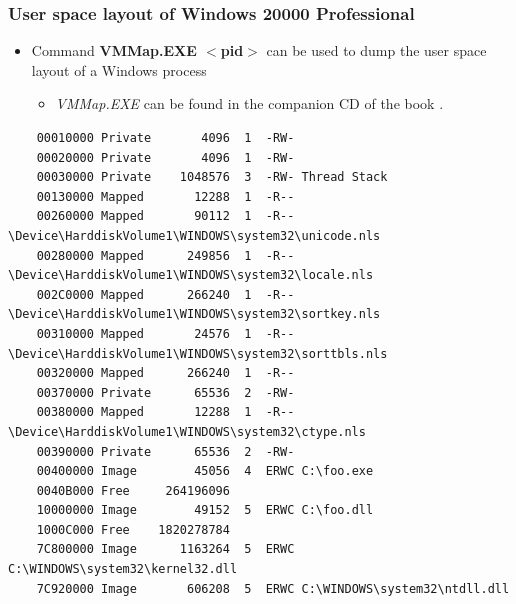 \documentclass[CJKutf8,xcolor=pdftex,dvipsnames,table]{beamer}
\begin{document}
\begin{CJK*}{UTF8}{song}
  \begin{frame}[fragile]
    \frametitle{User space layout of Windows 20000 Professional} \pause
    \begin{itemize}\parskip=0pt
    \item{Command \textbf{VMMap.EXE $<$pid$>$} can be used to dump the user space layout of a Windows process} \pause
      \begin{itemize}
      \item{\emph{VMMap.EXE} can be found in the companion CD of the book .} \pause
      \end{itemize}
    \end{itemize}
    {\tiny
\begin{verbatim}
    00010000 Private       4096  1  -RW-
    00020000 Private       4096  1  -RW-
    00030000 Private    1048576  3  -RW- Thread Stack
    00130000 Mapped       12288  1  -R--
    00260000 Mapped       90112  1  -R-- \Device\HarddiskVolume1\WINDOWS\system32\unicode.nls
    00280000 Mapped      249856  1  -R-- \Device\HarddiskVolume1\WINDOWS\system32\locale.nls
    002C0000 Mapped      266240  1  -R-- \Device\HarddiskVolume1\WINDOWS\system32\sortkey.nls
    00310000 Mapped       24576  1  -R-- \Device\HarddiskVolume1\WINDOWS\system32\sorttbls.nls
    00320000 Mapped      266240  1  -R--
    00370000 Private      65536  2  -RW-
    00380000 Mapped       12288  1  -R-- \Device\HarddiskVolume1\WINDOWS\system32\ctype.nls
    00390000 Private      65536  2  -RW-
    00400000 Image        45056  4  ERWC C:\foo.exe
    0040B000 Free     264196096
    10000000 Image        49152  5  ERWC C:\foo.dll
    1000C000 Free    1820278784
    7C800000 Image      1163264  5  ERWC C:\WINDOWS\system32\kernel32.dll
    7C920000 Image       606208  5  ERWC C:\WINDOWS\system32\ntdll.dll
\end{verbatim}
    }
\end{frame}
  
\iffalse


\end{CJK*}
\end{document}
